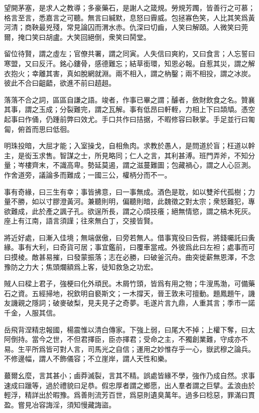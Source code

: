 \documentclass[12pt,a4paper]{ctexbook}
\begin{document}
望開茅塞，是求人之教導；多豪藥石，是謝人之箴規。勞規芳躅，皆善行之可慕；格言至言，悉嘉言之可聽。無言曰緘默，息怒曰霽威。包拯寡色笑，人比其笑爲黃河清；商鞅最兇殘，常見論囚而渭水赤。仇深曰切齒，人笑曰解頤。人微笑曰莞爾，掩口笑曰胡盧。大笑回絕倒，衆笑曰鬨堂。\par
留位待賢，謂之虛左；官僚共署，謂之同寅。人失信曰爽約，又曰食言；人忘誓曰寒盟，又曰反汗。銘心鏤骨，感德難忘；結草銜環，知恩必報。自惹其災，謂之解衣抱火；幸離其害，真如脫網就淵。兩不相入，謂之枘鑿；兩不相投，謂之冰炭。彼此不合曰齟齬，欲進不前曰趦趄。\par
落落不合之詞，區區自謙之語。竣者，作事已畢之謂；醵者，斂財飲食之名。贊襄其事，謂之玉成；分裂難完，謂之瓦解。事有低昂曰軒輊，力相上下曰頡頏。憑空起事曰作俑，仍踵前弊曰效尤。手口共作曰拮据，不暇修容曰鞅掌。手足並行曰匍匐，俯首而思曰低徊。\par
明珠投暗，大屈才能；入室操戈，自相魚肉。求教於愚人，是問道於盲；枉道以幹主，是衒玉求售。智謀之士，所見略同；仁人之言，其利甚溥。班門弄斧，不知分量；岑樓齊末，不識高卑。勢延莫遏，謂之滋蔓難圖；包藏禍心，謂之人心叵測。作舍道旁，議論多而難成；一國三公，權柄分而不一。\par
事有奇緣，曰三生有幸；事皆拂意，曰一事無成。酒色是耽，如以雙斧代孤樹；力量不勝，如以寸膠澄黃河。兼聽則明，偏聽則暗，此魏徵之對太宗；衆怒難犯，專欲難成，此於產之諷子孔。欲逞所長，謂之心煩技癢；絕無情慾，謂之槁木死灰。座上有江南，語言須謹；往來無白丁，交接皆賢。\par
將近好處，曰漸入佳境；無端倨傲，曰旁若無人。借事寬役曰告假，將錢囑託曰夤緣。事有大利，曰奇貨可居；事宜鑑前，曰覆車當戒。外彼爲此曰左袒；處事而可曰摸棱。敵甚易摧，曰發蒙振落；志在必勝，曰破釜沉舟。曲突徙薪無恩澤，不念豫防之力大；焦頭爛額爲上客，徒知救急之功宏。\par
賊人曰樑上君子，強梗曰化外頑民。木屑竹頭，皆爲有用之物；牛溲馬渤，可備藥石之資。五經掃地，祝欽明自褻斯文；一木撐天，晉王敦未可擅動。題鳳題午，譏友譏親之隱詞；破麥破梨，見夫見子之奇夢。毛遂片言九鼎，人重其言；季市一諾千金，人服其信。\par
岳飛背涅精忠報國，楊震惟以清白傳家。下強上弱，曰尾大不掉；上權下奪，曰太阿倒持。當今之世，不但君擇臣，臣亦擇君；受命之主，不獨創業難，守成亦不易。生平所爲皆可對人言，司馬光之自信；運用之妙惟存乎一心，嶽武穆之論兵。不修邊幅，謂人不飾儀容；不立崖岸，謂人天性和樂。\par
蕞爾幺麼，言其甚小；鹵莽滅裂，言其不精。誤處皆緣不學，強作乃成自然。求事速成曰躐等，過於禮貌曰足恭。假忠厚者謂之鄉愿，出人羣者謂之巨擘。孟浪由於輕浮，精詳出於暇豫。爲善則流芳百世，爲惡則遺臭萬年。過多曰稔惡，罪滿曰貫盈。嘗見冶容誨淫，須知慢藏誨盜。\par
\end{document}
